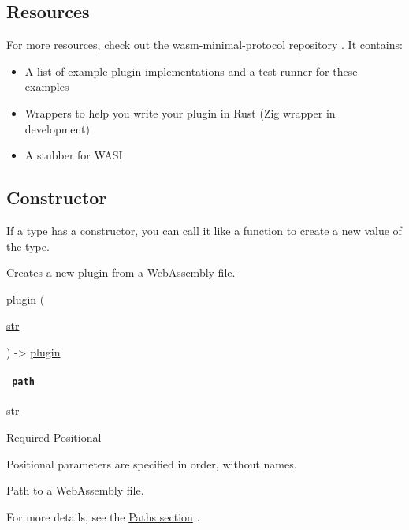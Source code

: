 \subsection{Resources}\label{resources}

For more resources, check out the
\href{https://github.com/astrale-sharp/wasm-minimal-protocol}{wasm-minimal-protocol
repository} . It contains:

\begin{itemize}
\tightlist
\item
  A list of example plugin implementations and a test runner for these
  examples
\item
  Wrappers to help you write your plugin in Rust (Zig wrapper in
  development)
\item
  A stubber for WASI
\end{itemize}

\subsection{\texorpdfstring{Constructor
{}}{Constructor }}\label{constructor}

\label{constructor-constructor-tooltip}
If a type has a constructor, you can call it like a function to create a
new value of the type.

Creates a new plugin from a WebAssembly file.

{ plugin } (

{ \href{/docs/reference/foundations/str/}{str} }

) -\textgreater{} \href{/docs/reference/foundations/plugin/}{plugin}

\paragraph{\texorpdfstring{\texttt{\ path\ }}{ path }}\label{constructor-path}

\href{/docs/reference/foundations/str/}{str}

{Required} {{ Positional }}

\label{constructor-path-positional-tooltip}
Positional parameters are specified in order, without names.

Path to a WebAssembly file.

For more details, see the \href{/docs/reference/syntax/\#paths}{Paths
section} .

\href{/docs/reference/foundations/panic/}{\pandocbounded{}}

